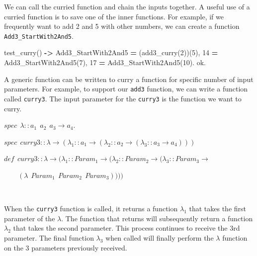\documentclass[
]{book}
\newenvironment{Shaded}{\begin{snugshade}}{\end{snugshade}}
\newcommand{\CharTok}[1]{\textcolor[rgb]{0.31,0.60,0.02}{#1}}
\newcommand{\DecValTok}[1]{\textcolor[rgb]{0.00,0.00,0.81}{#1}}
\newcommand{\FunctionTok}[1]{\textcolor[rgb]{0.00,0.00,0.00}{#1}}
\newcommand{\OperatorTok}[1]{\textcolor[rgb]{0.81,0.36,0.00}{\textbf{#1}}}
\newcommand{\VariableTok}[1]{\textcolor[rgb]{0.00,0.00,0.00}{#1}}
\begin{document}
We can call the curried function and chain the inputs together. A useful use of a curried function is to save one of the inner functions. For example, if we frequently want to add 2 and 5 with other numbers, we can create a function \texttt{Add3\_StartWith2And5}.

\begin{Shaded}
\begin{Highlighting}[]
\FunctionTok{test\_curry()} \OperatorTok{{-}\textgreater{}}
    \VariableTok{Add3\_StartWith2And5} \OperatorTok{=} \FunctionTok{(add3\_curry(}\DecValTok{2}\FunctionTok{))(}\DecValTok{5}\FunctionTok{),}
    \DecValTok{14} \OperatorTok{=} \VariableTok{Add3\_StartWith2And5}\FunctionTok{(}\DecValTok{7}\FunctionTok{),}
    \DecValTok{17} \OperatorTok{=} \VariableTok{Add3\_StartWith2And5}\FunctionTok{(}\DecValTok{10}\FunctionTok{).}
    \CharTok{ok}\FunctionTok{.}
\end{Highlighting}
\end{Shaded}

A generic function can be written to curry a function for specific number of input parameters. For example, to support our \texttt{add3} function, we can write a function called \texttt{curry3}. The input parameter for the \texttt{curry3} is the function we want to curry.

\begin{formulabox}
\(spec ~ ~ \lambda :: a_1 ~ ~ a_2 ~ ~ a_3 \rightarrow a_4.\)

\(spec ~ ~ curry3 :: \lambda \rightarrow (\lambda_1 :: a_1 \rightarrow (\lambda_2 :: a_2 \rightarrow (\lambda_3 :: a_3 \rightarrow a_4)))\)

\(de\mathit{f} ~ ~ curry3 :: \lambda \rightarrow (\lambda_1 :: Param_1 \rightarrow (\lambda_2 :: Param_2 \rightarrow (\lambda_3 :: Param_3 \rightarrow\)

\(\quad \quad (\lambda ~ ~ Param_1 ~ ~ Param_2 ~ ~ Param_3))))\)

\end{formulabox}

\(\nonumber\)

When the \texttt{curry3} function is called, it returns a function \(\lambda_1\) that takes the first parameter of the \(\lambda\). The function that returns will subsequently return a function \(\lambda_2\) that takes the second parameter. This process continues to receive the 3rd parameter. The final function \(\lambda_3\) when called will finally perform the \(\lambda\) function on the 3 parameters previously received.
\end{document}
